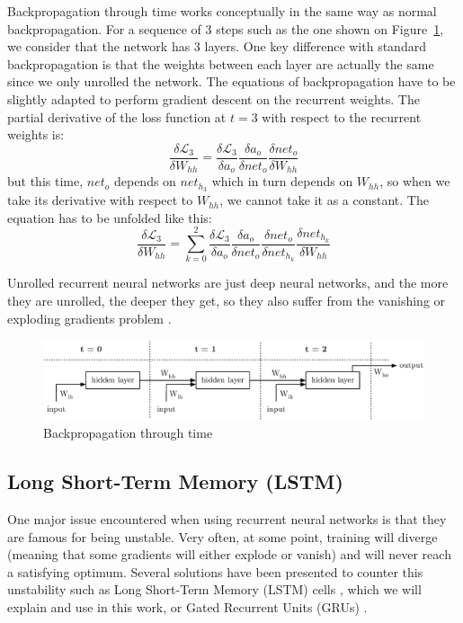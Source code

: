 Backpropagation through time \cite{bptt} works conceptually in the same way
as normal backpropagation. For a sequence of 3 steps such as the one shown
on Figure~\ref{fig:bptt}, we consider that the network has 3 layers. 
One key difference with standard backpropagation is that the weights
between each layer are actually the same since we only unrolled the network.
The equations of backpropagation have to be slightly adapted to perform
gradient descent on the recurrent weights. The partial derivative of the
loss function at $t=3$ with respect to the recurrent weights is:
\begin{equation}
	\frac{\delta\mathcal{L}_3}{\delta W_{hh}} = 
\frac{\delta\mathcal{L}_3}{\delta a_o}
\frac{\delta a_o}{\delta net_o}
\frac{\delta net_o}{\delta W_{hh}}
	\label{eq:chainrule_bptt}
\end{equation}
but this time, $net_o$ depends on $net_{h_3}$ which in turn depends on $W_{hh}$, so
when we take its derivative with respect to $W_{hh}$, we cannot take it as
a constant. The equation has to be unfolded like this:
\begin{equation}
	\frac{\delta\mathcal{L}_3}{\delta W_{hh}} = 
	\sum\limits_{k=0}^2
\frac{\delta\mathcal{L}_3}{\delta a_o}
\frac{\delta a_o}{\delta net_o}
\frac{\delta net_o}{\delta net_{h_k}}
	\frac{\delta net_{h_k}}{\delta W_{hh}}
	\label{eq:chainrule_bptt}
\end{equation}

Unrolled recurrent neural networks are just deep neural networks, and the
more they are unrolled, the deeper they get, so they also suffer from
the vanishing or exploding gradients problem \cite{vanishing_gradient_rnn}.

\begin{figure}
	\centering
	\includegraphics[width=0.8\linewidth]{fig/bptt.eps}
	\caption{Backpropagation through time}
	\label{fig:bptt}
\end{figure}

\subsection{Long Short-Term Memory (LSTM)}
One major issue encountered when using recurrent neural networks is that they
are famous for being unstable. Very often, at some point, training will diverge
(meaning that some gradients will either explode or vanish)
and will never reach a satisfying optimum. Several solutions have been presented
to counter this unstability such as Long Short-Term Memory (LSTM)
cells \cite{lstm}, which we will explain and use in this work, or Gated
Recurrent Units (GRUs) \cite{grus}. \\

